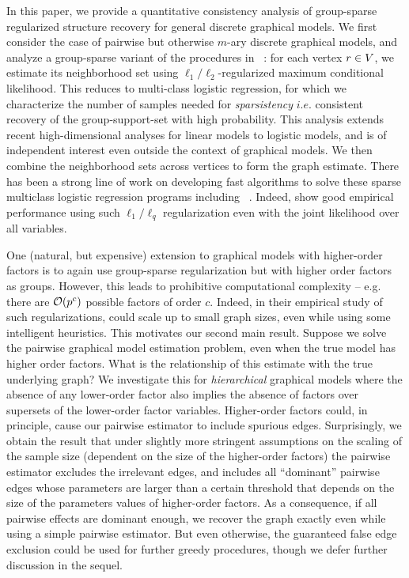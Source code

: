  In this paper, we provide a quantitative consistency analysis of group-sparse regularized structure recovery for general discrete graphical models. We first consider the case of pairwise but otherwise $m$-ary discrete graphical models, and analyze a group-sparse variant of the procedures in ~\citep{RWLIsing,Meinshausen:06}: for each vertex $r \in V$, we estimate its neighborhood set using $\ell_1/\ell_2$-regularized maximum conditional likelihood. This reduces to multi-class logistic regression, for which we characterize the number of samples needed for \emph{sparsistency} $i.e.$ consistent recovery of the group-support-set with high probability. This analysis extends recent high-dimensional analyses for linear models to logistic models, and is of independent interest even outside the context of graphical models. We then combine the neighborhood sets across vertices to form the graph estimate. There has been a strong line of work on developing fast algorithms to solve these sparse multiclass logistic regression programs including ~\citet{MGB08,KCFH05}. Indeed, \citep{Dahinden07,Dahinden10} show good empirical performance using such $\ell_1/\ell_q$ regularization even with the joint likelihood over all variables.

 One (natural, but expensive)  extension to graphical models with higher-order factors is to again use group-sparse regularization but with higher order factors as groups. However, this leads to prohibitive computational complexity -- e.g. there are $\mathcal{O}(p^{c})$ possible factors of order $c$. Indeed, in their empirical study of such regularizations, \citet{Dahinden07,Dahinden10} could scale up to small graph sizes, even while using some intelligent heuristics. This motivates our second main result. Suppose we solve the pairwise graphical model estimation problem, even when the true model has higher order factors. What is the relationship of this estimate with the true underlying graph? We investigate this for {\em hierarchical} graphical models where the absence of any lower-order factor also implies the absence of factors over supersets of the lower-order factor variables. Higher-order factors could, in principle, cause our pairwise estimator to include spurious edges. Surprisingly, we obtain the result that under slightly more stringent assumptions on the scaling of the sample size (dependent on the size of the higher-order factors) the pairwise estimator excludes the irrelevant edges, and includes all ``dominant'' pairwise edges whose parameters are larger than a certain threshold that depends on the size of the parameters values of higher-order factors. As a consequence, if all pairwise effects are dominant enough, we recover the graph exactly even while using a simple pairwise estimator. But even otherwise, the guaranteed false edge exclusion could be used for further greedy procedures, though we defer further discussion in the sequel.

